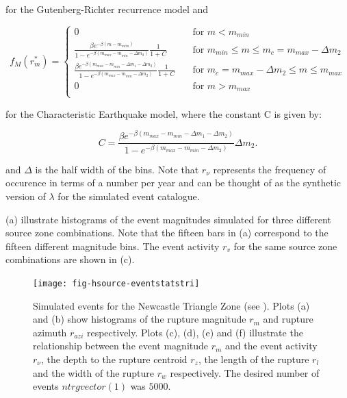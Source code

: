 \begin{enumerate}
for the Gutenberg-Richter recurrence model \citep{dr_Kramer96a} and 

\begin{equation} \label{eq:pdf_ch}
f_M(r_m^*) = \left\{
\begin{array}{ll}
0 & \quad \mbox{for $m < m_{min}$} \\
\frac{\beta e ^{- \beta (m-m_{miin})}}{1-e^{-\beta (m_{max} - m_{min} - \Delta m_{2})}} \frac{1}{1+C}& \quad \mbox{for $m_{min} \leq m \leq m_{c} = m_{max} - \Delta m_{2}$} \\
\frac{\beta e ^{- \beta (m_{max}-m_{min}-\Delta m_{1} - \Delta m_{2})}}{1-e^{-\beta (m_{max} - m_{min} - \Delta m_{2})}}  \frac{1}{1+C}& \quad \mbox{for $m_{c} = m_{max} - \Delta m_{2} \leq m \leq m_{max}$} \\
0 & \quad \mbox{for $m > m_{max}$} \\ 
\end{array}
 \right. 
\end{equation}

for the Characteristic Earthquake model\citep{dr_schwartz94}, where the constant C is given by:

\begin{equation}
C = \frac{\beta e ^{- \beta (m_{max}-m_{min}-\Delta m_{1} - \Delta m_{2})}}  {1-e^{-\beta (m_{max} - m_{min} - \Delta m_{2})}}  \Delta m_{2} .
\end{equation}


\citep{dr_Kramer96a} and $\Delta$ is the half width of the bins.
Note that $r_\nu$ represents the frequency of occurence in terms
of a number per year and can be thought of as the synthetic
version of $\lambda$ for the simulated event catalogue.
\end{enumerate}



(a)
illustrate histograms of the event magnitudes simulated for three
different source zone combinations. Note that the fifteen bars in
(a)
correspond to the fifteen different magnitude bins. The event
activity $r_v$ for the same source zone combinations are shown in
(c).

\begin{figure}
  \vspace{0.8em}
\begin{center}
\texttt{[image: fig-hsource-eventstatstri]}
\end{center}
\caption{Simulated events for the Newcastle Triangle Zone (see
\citealt{dr_Dhu02b}). Plots (a) and (b) show histograms of the
rupture magnitude $r_m$ and rupture azimuth $r_{azi}$
respectively. Plots (c), (d), (e) and (f) illustrate the
relationship between the event magnitude $r_m$ and the event
activity $r_\nu$, the depth to the rupture centroid $r_z$, the
length of the rupture $r_l$ and the width of the rupture $r_w$
respectively. The desired number of events $ntrgvector(1)$ was
$5000$.} \label{fig:source-catalogue-results1}
\end{figure}

